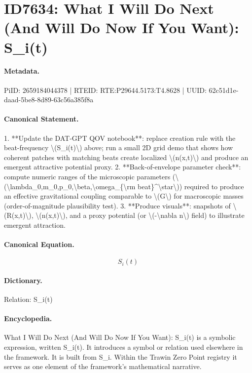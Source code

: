 \section*{ID7634: What I Will Do Next (And Will Do Now If You Want): S\_i(t)}
\paragraph{Metadata.}
PiID: 2659184044378 | RTEID: RTE:P29644.5173:T4.8628 | UUID: 62c51d1e-daad-5be8-8d89-63c56a385f8a

\paragraph{Canonical Statement.}
1. **Update the DAT-GPT QOV notebook**: replace creation rule with the beat-frequency \textbackslash{}(S\_i(t)\textbackslash{}) above; run a small 2D grid demo that shows how coherent patches with matching beats create localized \textbackslash{}(n(x,t)\textbackslash{}) and produce an emergent attractive potential proxy. 2. **Back-of-envelope parameter check**: compute numeric ranges of the microscopic parameters (\textbackslash{}(\textbackslash{}lambda\_0,m\_0,p\_0,\textbackslash{}beta,\textbackslash{}omega\_\{\textbackslash{}rm beat\}\textasciicircum{}\textbackslash{}star\textbackslash{})) required to produce an effective gravitational coupling comparable to \textbackslash{}(G\textbackslash{}) for macroscopic masses (order-of-magnitude plausibility test). 3. **Produce visuals**: snapshots of \textbackslash{}(R(x,t)\textbackslash{}), \textbackslash{}(n(x,t)\textbackslash{}), and a proxy potential (or \textbackslash{}(-\textbackslash{}nabla n\textbackslash{}) field) to illustrate emergent attraction.

\paragraph{Canonical Equation.}
\[
S_i(t)
\]

\paragraph{Dictionary.}
Relation: S\_i(t)

\paragraph{Encyclopedia.}
What I Will Do Next (And Will Do Now If You Want): S\_i(t) is a symbolic expression, written S\_i(t). It introduces a symbol or relation used elsewhere in the framework. It is built from S\_i. Within the Trawin Zero Point registry it serves as one element of the framework's mathematical narrative.
